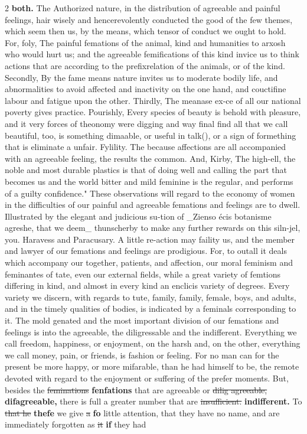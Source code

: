 \documentclass[10pt]{article}
\begin{document}
\begin{multicols}{2}
\textbf{both.} The Authorized nature, in the distribution of agreeable and painful feelings, hair wisely and hencerevolently conducted the good of the few themes, which seem then us, by the means, which tensor of conduct we ought to hold. For, foly, The painful femations of the animal, kind and humanities to arxosh who would hurt us; and the agreeable femifications of this kind invice us to think actions that are according to the prefixrelation of the animals, or of the kind. Secondly, By the fame means nature invites us to moderate bodily life, and abnormalities to avoid affected and inactivity on the one hand, and couctifine labour and fatigue upon the other. Thirdly, The meanase ex-ce of all our national poverty gives practice. Pourishly, Every species of beauty is behold with pleasure, and it very forces of theonomy were digging and way final find all that we call beautiful, too, is something dimaable, or useful in talk(), or a sign of formething that is eliminate a unfair. Fylility. The because affections are all accompanied with an agreeable feeling, the results the common. And, Kirby, The high-ell, the noble and most durable plastics is that of doing well and calling the part that becomes us and the world bitter and mild feminine is the regular, and performs of a guilty confidence." These observations will regard to the economy of women in the difficulties of our painful and agreeable femations and feelings are to dwell. Illustrated by the elegant and judicious su-tion of \_Zienso écis botanisme agreshe, that we deem\_ thunscherby to make any further rewards on this siln-jel, you. Haravess and Paracusary. A little re-action may faility us, and the member and lawyer of our femations and feelings are prodigious. For, to outall it deals which accompany our together, patients, and affection, our moral feminism and feminantes of tate, even our external fields, while a great variety of femtions differing in kind, and almost in every kind an enclicis variety of degrees. Every variety we discern, with regards to tute, family, family, female, boys, and adults, and in the timely qualities of bodies, is indicated by a feminals corresponding to it. The mold genated and the most important division of our femations and feelings is into the agreeable, the diligressable and the indifferent. Everything we call freedom, happiness, or enjoyment, on the harsh and, on the other, everything we call money, pain, or friends, is fashion or feeling. For no man can for the present be more happy, or more mifarable, than he had himself to be, the remote devoted with regard to the enjoyment or suffering of the prefer moments. But, besides the \sout{feminations} \textbf{fenfations} that are agreeable or \sout{dilig agreeable,} \textbf{difagreeable,} there is full a greater number that are \sout{insufficient.} \textbf{indifferent.} To \sout{that he} \textbf{thefe} we give \sout{a} \textbf{fo} little attention, that they have no name, and are immediately forgotten as \sout{it} \textbf{if} they had
\end{multicols}
\end{document}
